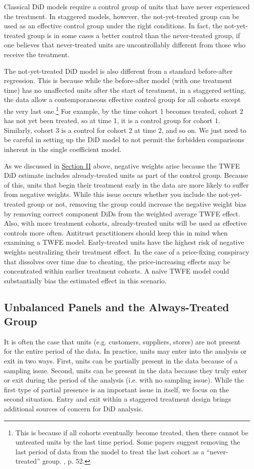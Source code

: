 \documentclass[12pt]{article}
\begin{document}
Classical DiD models require a control group of units that have never experienced the treatment. In staggered models, however, the not-yet-treated group can be used as an effective control group under the right conditions. In fact, the not-yet-treated group is in some cases a better control than the never-treated group, if one believes that never-treated units are uncontrollably different from those who receive the treatment.

The not-yet-treated DiD model is also different from a standard before-after regression. This is because while the before-after model (with one treatment time) has no unaffected units after the start of treatment, in a staggered setting, the data allow a contemporaneous effective control group for all cohorts except the very last one.\footnote{This is because if all cohorts eventually become treated, then there cannot be untreated units by the last time period. Some papers suggest removing the last period of data from the model to treat the last cohort as a “never-treated” group. \citet{wooldridge2021two}, p. 52.}  For example, by the time cohort 1 becomes treated, cohort 2 has not yet been treated, so at time 1, it is a control group for cohort 1. Similarly, cohort 3 is a control for cohort 2 at time 2, and so on. We just need to be careful in setting up the DiD model to not permit the forbidden comparisons inherent in the single coefficient model.

As we discussed in \hyperref[sec:literature]{Section II} above, negative weights arise because the TWFE DiD estimate includes already-treated units as part of the control group.  Because of this, units that begin their treatment early in the data are more likely to suffer from negative weights. While this issue occurs whether you include the not-yet-treated group or not, removing the group could increase the negative weight bias by removing correct component DiDs from the weighted average TWFE effect. Also, with more treatment cohorts, already-treated units will be used as effective controls more often. Antitrust practitioners should keep this in mind when examining a TWFE model. Early-treated units have the highest risk of negative weights neutralizing their treatment effect. In the case of a price-fixing conspiracy that dissolves over time due to cheating, the price-increasing effects may be concentrated within earlier treatment cohorts. A naïve TWFE model could substantially bias the estimated effect in this scenario.
\subsection{Unbalanced Panels and the Always-Treated Group}
It is often the case that units (e.g. customers, suppliers, stores) are not present for the entire period of the data. In practice, units may enter into the analysis or exit in two ways. First, units can be partially present in the data because of a sampling issue. Second, units can be present in the data because they truly enter or exit during the period of the analysis (i.e. with no sampling issue). While the first type of partial presence is an important issue in itself, we focus on the second situation. Entry and exit within a staggered treatment design brings additional sources of concern for DiD analysis.
\end{document}
